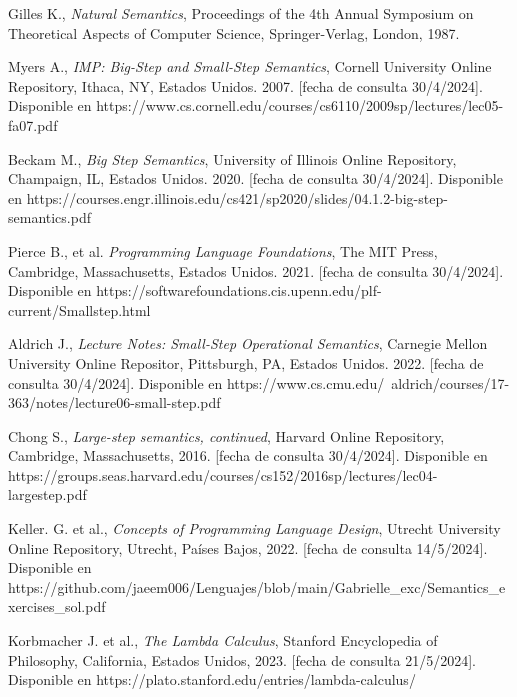 \begin{thebibliography}{11}
    \bibitem{}
    \label{sec:101}
    \hypertarget{101}{}
    Gilles K., \textit{Natural Semantics}, Proceedings of the 4th Annual Symposium on Theoretical Aspects of Computer Science, Springer-Verlag, London, 1987.

    \bibitem{}
    \label{sec:102}
    \hypertarget{102}{}
    Myers A., \textit{IMP: Big-Step and Small-Step Semantics}, Cornell University Online Repository,  Ithaca, NY, Estados Unidos. 2007. [fecha de consulta 30/4/2024]. Disponible en https://www.cs.cornell.edu/courses/cs6110/2009sp/lectures/lec05-fa07.pdf

    \bibitem{}
    \label{sec:103}
    \hypertarget{103}{}
    Beckam M., \textit{Big Step Semantics}, University of Illinois Online Repository, Champaign, IL, Estados Unidos. 2020. [fecha de consulta 30/4/2024]. Disponible en  https://courses.engr.illinois.edu/cs421/sp2020/slides/04.1.2-big-step-semantics.pdf

    \bibitem{}
    \label{sec:104}
    \hypertarget{104}{}
    Pierce B., et al. \textit{Programming Language Foundations}, The MIT Press, Cambridge, Massachusetts, Estados Unidos. 2021. [fecha de consulta 30/4/2024]. Disponible en  https://softwarefoundations.cis.upenn.edu/plf-current/Smallstep.html

    \bibitem{}
    \label{sec:105}
    \hypertarget{105}{}
    Aldrich J., \textit{Lecture Notes: Small-Step Operational Semantics}, Carnegie Mellon University Online Repositor, Pittsburgh, PA, Estados Unidos. 2022.  [fecha de consulta 30/4/2024]. Disponible en https://www.cs.cmu.edu/~aldrich/courses/17-363/notes/lecture06-small-step.pdf

     \bibitem{}
    \label{sec:106}
    \hypertarget{106}{}
    Chong S., \textit{Large-step semantics, continued},  Harvard Online Repository, Cambridge, Massachusetts, 2016.  [fecha de consulta 30/4/2024]. Disponible en  https://groups.seas.harvard.edu/courses/cs152/2016sp/lectures/lec04-largestep.pdf

     \bibitem{}
    \label{sec:107}
    \hypertarget{107}{}
    Keller. G. et al., \textit{Concepts of Programming Language Design}, Utrecht University Online Repository, Utrecht, Países Bajos, 2022.  [fecha de consulta 14/5/2024]. Disponible en https://github.com/jaeem006/Lenguajes/blob/main/Gabrielle\_exc/Semantics\_exercises\_sol.pdf

     \bibitem{}
    \label{sec:108}
    \hypertarget{108}{}
    Korbmacher J. et al., \textit{The Lambda Calculus}, Stanford Encyclopedia of Philosophy, California, Estados Unidos, 2023.  [fecha de consulta 21/5/2024]. Disponible en https://plato.stanford.edu/entries/lambda-calculus/


\end{thebibliography}
